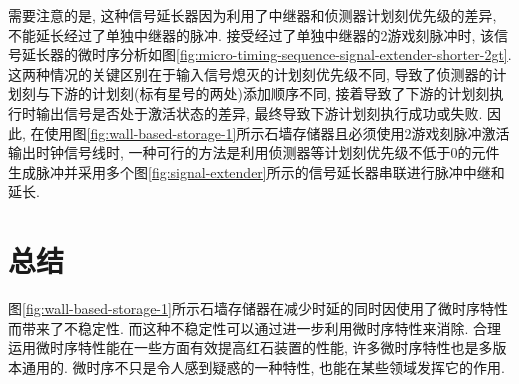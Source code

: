 \documentclass{article}
\begin{document}
    需要注意的是, 这种信号延长器因为利用了中继器和侦测器计划刻优先级的差异, 不能延长经过了单独中继器的脉冲. 接受经过了单独中继器的2游戏刻脉冲时, 该信号延长器的微时序分析如图\ref{fig:micro-timing-sequence-signal-extender-shorter-2gt}. 这两种情况的关键区别在于输入信号熄灭的计划刻优先级不同, 导致了侦测器的计划刻与下游的计划刻(标有星号的两处)添加顺序不同, 接着导致了下游的计划刻执行时输出信号是否处于激活状态的差异, 最终导致下游计划刻执行成功或失败. 因此, 在使用图\ref{fig:wall-based-storage-1}所示石墙存储器且必须使用2游戏刻脉冲激活输出时钟信号线时, 一种可行的方法是利用侦测器等计划刻优先级不低于0的元件生成脉冲并采用多个图\ref{fig:signal-extender}所示的信号延长器串联进行脉冲中继和延长.

    \section{总结}
    图\ref{fig:wall-based-storage-1}所示石墙存储器在减少时延的同时因使用了微时序特性而带来了不稳定性. 而这种不稳定性可以通过进一步利用微时序特性来消除. 合理运用微时序特性能在一些方面有效提高红石装置的性能, 许多微时序特性也是多版本通用的. 微时序不只是令人感到疑惑的一种特性, 也能在某些领域发挥它的作用.
    
\end{document}
